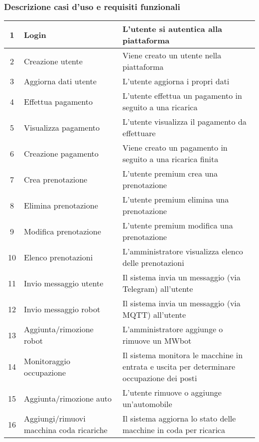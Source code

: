 \documentclass{article}
\begin{document}
\subsubsection{Descrizione casi d'uso e requisiti funzionali}
\begin{table}[H]
    \centering
    \begin{tabular}{|c|p{3cm}|p{7cm}|}
        \hline
         1 & Login & L'utente si autentica alla piattaforma \\
         \hline
         2 & Creazione utente & Viene creato un utente nella piattaforma \\
         \hline
         3 & Aggiorna dati utente & L'utente aggiorna i propri dati \\
         \hline
         4 & Effettua pagamento & L'utente effettua un pagamento in seguito a una ricarica \\
         \hline
         5 & Visualizza pagamento & L'utente visualizza il pagamento da effettuare \\
         \hline
         6 & Creazione pagamento & Viene creato un pagamento in seguito a una ricarica finita \\
         \hline
         7 & Crea prenotazione & L'utente premium crea una prenotazione \\
         \hline
         8 & Elimina prenotazione & L'utente premium elimina una prenotazione \\
         \hline
         9 & Modifica prenotazione & L'utente premium modifica una prenotazione \\
         \hline
         10 & Elenco prenotazioni & L'amministratore visualizza elenco delle prenotazioni \\
         \hline
         11 & Invio messaggio utente & Il sistema invia un messaggio (via Telegram) all'utente \\
         \hline
         12 & Invio messaggio robot & Il sistema invia un messaggio (via MQTT) all'utente \\
         \hline
         13 & Aggiunta/rimozione robot & L'amministratore aggiunge o rimuove un MWbot \\
         \hline
         14 & Monitoraggio occupazione & Il sistema monitora le macchine in entrata e uscita per determinare occupazione dei posti \\
         \hline
         15 & Aggiunta/rimozione auto & L'utente rimuove o aggiunge un'automobile \\
         \hline
         16 & Aggiungi/rimuovi macchina coda ricariche & Il sistema aggiorna lo stato delle macchine in coda per ricarica \\

\end{tabular}
\end{table}
\end{document}
